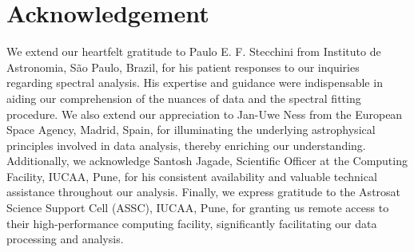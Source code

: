 \section*{Acknowledgement}
	We extend our heartfelt gratitude to Paulo E. F. Stecchini from Instituto de Astronomia, São Paulo, Brazil, for his patient responses to our inquiries regarding spectral analysis. His expertise and guidance were indispensable in aiding our comprehension of the nuances of data and the spectral fitting procedure. We also extend our appreciation to Jan-Uwe Ness from the European Space Agency, Madrid, Spain, for illuminating the underlying astrophysical principles involved in data analysis, thereby enriching our understanding. Additionally, we acknowledge Santosh Jagade, Scientific Officer at the Computing Facility, IUCAA, Pune, for his consistent availability and valuable technical assistance throughout our analysis. Finally, we express gratitude to the Astrosat Science Support Cell (ASSC), IUCAA, Pune, for granting us remote access to their high-performance computing facility, significantly facilitating our data processing and analysis.